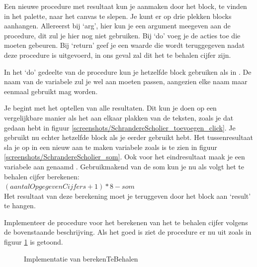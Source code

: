 Een nieuwe procedure met resultaat kun je aanmaken door het  block, te vinden in het  palette, naar het canvas te slepen. Je kunt er op drie plekken blocks aanhangen. Allereerst bij `arg', hier kun je een argument meegeven aan de procedure, dit zul je hier nog niet gebruiken. Bij `do' voeg je de acties toe die moeten gebeuren. Bij `return' geef je een waarde die wordt teruggegeven nadat deze procedure is uitgevoerd, in ons geval zal dit het te behalen cijfer zijn.

In het `do' gedeelte van de procedure kun je hetzelfde  block gebruiken als in . De naam van de variabele zul je wel aan moeten passen, aangezien elke naam maar eenmaal gebruikt mag worden. 

Je begint met het optellen van alle resultaten. Dit kun je doen op een vergelijkbare manier als het aan elkaar plakken van de teksten, zoals je dat gedaan hebt in figuur \ref{screenshots/SchrandereScholier_toevoegen_click}. Je gebruikt nu echter hetzelfde \block{+} block als je eerder gebruikt hebt. Het tussenresultaat sla je op in een nieuw aan te maken variabele zoals is te zien in figuur \ref{screenshots/SchrandereScholier_som}. Ook voor het eindresultaat maak je een variabele aan genaamd . Gebruikmakend van de som kun je nu als volgt het te behalen cijfer berekenen: \\$(aantalOpgegevenCijfers+1) * 8 - som$ \\Het resultaat van deze berekening moet je teruggeven door het block  aan `result' te hangen.

 \begin{opgave}
    \opgVraag
Implementeer de procedure voor het berekenen van het te behalen cijfer volgens de bovenstaande beschrijving.
    \opgUitwerking
    Als het goed is ziet de procedure er nu uit zoals in figuur \ref{screenshots/SchrandereScholier_berekenTeBehalen} is getoond.
\end{opgave}

\begin{figure}
    \caption{\label{screenshots/SchrandereScholier_berekenTeBehalen} Implementatie van berekenTeBehalen}
\end{figure}


